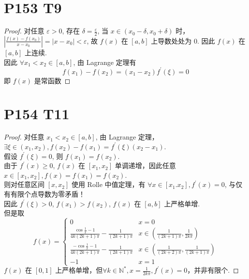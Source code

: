 \documentclass{article}
\begin{document}
\section*{P153 T9}

\begin{proof}
    对任意 $\varepsilon > 0$, 存在 $\delta = \frac{\varepsilon}{2}$, 当 $x \in (x_0 - \delta, x_0 + \delta)$ 时，$\displaystyle{\left\lvert \frac{f(x) - f(x_0)}{x - x_0}\right\rvert = \left\lvert x - x_0\right\rvert < \varepsilon}$, 故 $f(x)$ 在 $[a, b]$ 上导数处处为 0. 因此 $f(x)$ 在$[a, b]$ 上连续.\\
    因此 $\forall x_1 < x_2 \in [a, b]$, 由 Lagrange 定理有
    \[
        f(x_1) - f(x_2) = (x_1 - x_2)f^\prime(\xi) = 0 
    \]
    即 $f(x)$ 是常函数
\end{proof}

\section*{P154 T11}

\begin{proof}
    对任意 $x_1 < x_2 \in [a, b]$, 由 Lagrange 定理，$\exists \xi \in (x_1, x_2), f(x_2) - f(x_1) = f^\prime(\xi)(x_2 - x_1)$. \\
    假设 $f^\prime(\xi) = 0$, 则 $f(x_1) = f(x_2)$. \\
    由于 $f^\prime(x) \geqslant 0$, $f(x)$ 在 $[x_1, x_2]$ 单调递增，因此任意 $x \in [x_1, x_2], f(x) = f(x_1) = f(x_2)$.\\
    则对任意区间 $[x, x_2]$ 使用 Rolle 中值定理，有 $\forall x \in [x_1. x_2], f^\prime(x) = 0$, 与仅有有限个点导数为零矛盾！\\
    因此 $f^\prime(\xi) > 0$, $f(x_1) > f(x_2)$, $f(x)$ 在 $[a, b]$ 上严格单增. \qedhere \\
    但是取
    \[
        f(x) = \begin{cases}
            0 & x = 0 \\
            \frac{\cos\frac{1}{x} - 1}{4k(2k + 1)\pi} - \frac{1}{(2k + 1)\pi} & x \in \left(\frac{1}{(2k + 1)\pi}, \frac{1}{2k\pi}\right) \\
            \frac{-\cos\frac{1}{x} - 1}{4k(2k + 1)\pi} - \frac{1}{(2k + 1)\pi} &  x \in \left(\frac{1}{(2k + 2)\pi}, \frac{1}{(2k + 1)\pi}\right) \\
            -1 & x = 1
        \end{cases}
    \]
    $f(x)$ 在 $[0, 1]$ 上严格单增，但$\forall k \in \mathbb{N}^*, x = \frac{1}{2k\pi}, f^\prime(x) = 0$，并非有限个.
\end{proof}
\end{document}
